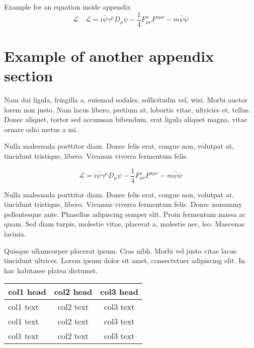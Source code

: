 \documentclass[proof]{WileyASNA-v1}
\begin{document}
Example for an equation inside appendix
\begin{equation}
\mathcal{L}\quad \mathbf{\mathcal{L}} = i \bar{\psi} \gamma^\mu D_\mu \psi - \frac{1}{4} F_{\mu\nu}^a F^{a\mu\nu} - m \bar{\psi} \psi\label{eq25}
\end{equation}

\section{Example of another appendix section\label{app3}}%

Nam dui ligula, fringilla a, euismod sodales, sollicitudin vel, wisi. Morbi auctor lorem non justo. Nam lacus libero,
pretium at, lobortis vitae, ultricies et, tellus. Donec aliquet, tortor sed accumsan bibendum, erat ligula aliquet magna,
vitae ornare odio metus a mi. 

Nulla malesuada porttitor diam. Donec felis erat, congue non, volutpat at, tincidunt tristique, libero. Vivamus
viverra fermentum felis. 

\begin{equation}
\mathcal{L} = i \bar{\psi} \gamma^\mu D_\mu \psi
    - \frac{1}{4} F_{\mu\nu}^a F^{a\mu\nu} - m \bar{\psi} \psi
\label{eq26}
\end{equation}

Nulla malesuada porttitor diam. Donec felis erat, congue non, volutpat at, tincidunt tristique, libero. Vivamus
viverra fermentum felis. Donec nonummy pellentesque ante. Phasellus adipiscing semper elit. Proin fermentum massa
ac quam. Sed diam turpis, molestie vitae, placerat a, molestie nec, leo. Maecenas lacinia. 

Quisque ullamcorper placerat ipsum. Cras nibh. Morbi vel justo vitae lacus tincidunt ultrices. Lorem ipsum dolor sit
amet, consectetuer adipiscing elit. In hac habitasse platea dictumst. 


\begin{center}
\begin{tabular*}{20pc}{@{\extracolsep\fill}lcc@{\extracolsep\fill}}%
\toprule
\textbf{col1 head} & \textbf{col2 head} & \textbf{col3 head} \\
\midrule
col1 text & col2 text & col3 text \\
col1 text & col2 text & col3 text \\
col1 text & col2 text & col3 text \\
\bottomrule
\end{tabular*}
\end{center}
\end{document}

